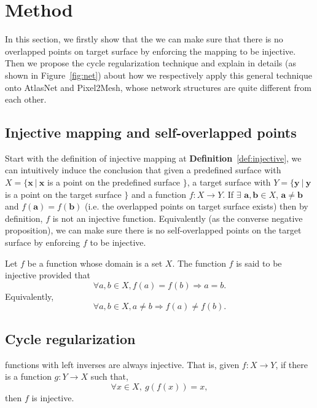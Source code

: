 \section{Method}
In this section, we firstly show that the we can make sure that there is no overlapped points on target surface by enforcing the mapping to be injective. 
Then we propose the cycle regularization technique and explain in details (as shown in Figure~\ref{fig:net}) about how we respectively apply this general technique onto AtlasNet\cite{atlasnet} and Pixel2Mesh\cite{pixel2mesh}, whose network structures are quite different from each other. 
\subsection{Injective mapping and self-overlapped points}
\label{subsec:inj}
Start with the definition of injective mapping at \textbf{Definition}~\ref{def:injective}, we can intuitively induce the conclusion that given a predefined surface with $ X =\{\mathbf{x}~|~\mathbf{x}$ is a point on the predefined surface $ \} $, a target surface with $ Y =\{\mathbf{y}~|~\mathbf{y}$ is a point on the target surface $ \} $ and a function $f:X \rightarrow Y$. If $\exists$ $ \mathbf{a},\mathbf{b} \in X$, $\mathbf{a} \neq \mathbf{b}$ and $f(\mathbf{a}) = f(\mathbf{b})$ (i.e. the overlapped points on target surface exists) then by definition, $f$ is not an injective function. Equivalently (as the converse negative proposition), we can make sure there is no self-overlapped points on the target surface by enforcing $f$ to be injective.
\begin{m_def}
\label{def:injective}
Let $f$ be a function whose domain is a set $X$. The function $f$ is said to be injective provided that
\begin{equation}
\forall a,b \in X, f(a) = f(b) \Rightarrow a = b.
\end{equation}
Equivalently, 
\begin{equation}
\forall a,b \in X, a \neq b \Rightarrow f(a) \neq f(b).
\end{equation}
\end{m_def}

\subsection{Cycle regularization}
\label{subsec:cyclereg}
\begin{m_thm}
\label{thm:injective}
functions with left inverses are always injective. That is, given $f:X \rightarrow Y$, if there is a function $g:Y \rightarrow X$ such that,
\begin{equation}
\label{equ:injective}
\forall x \in X,~g(f(x)) = x,
\end{equation}
then $f$ is injective.
\end{m_thm}


